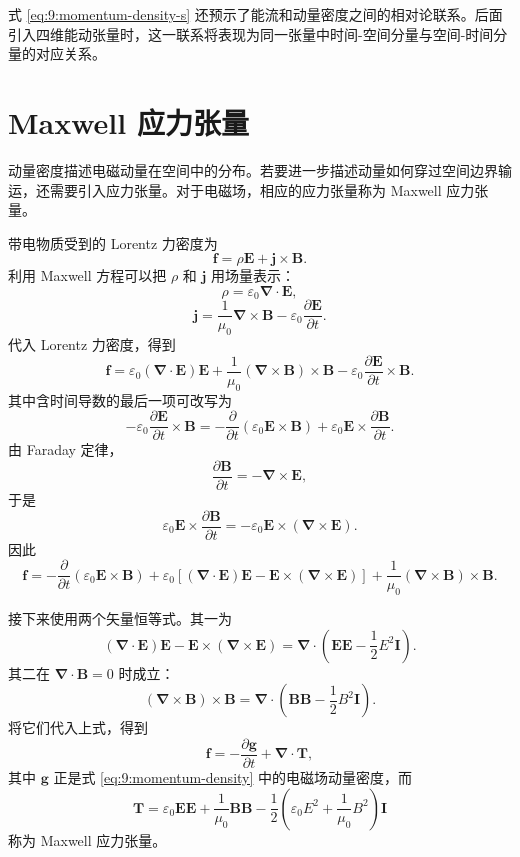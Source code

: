 式 \eqref{eq:9:momentum-density-s} 还预示了能流和动量密度之间的相对论联系。后面引入四维能动张量时，这一联系将表现为同一张量中时间-空间分量与空间-时间分量的对应关系。

\section{Maxwell 应力张量}

动量密度描述电磁动量在空间中的分布。若要进一步描述动量如何穿过空间边界输运，还需要引入应力张量。对于电磁场，相应的应力张量称为 Maxwell 应力张量。

带电物质受到的 Lorentz 力密度为
\[
\bm{f}
=
\rho\bm{E}
+
\bm{j}\times\bm{B}.
\]
利用 Maxwell 方程可以把 $\rho$ 和 $\bm{j}$ 用场量表示：
\[
\rho
=
\varepsilon_{0}\bm{\nabla}\cdot\bm{E},
\]
\[
\bm{j}
=
\frac{1}{\mu_{0}}\bm{\nabla}\times\bm{B}
-
\varepsilon_{0}
\frac{\partial\bm{E}}{\partial t}.
\]
代入 Lorentz 力密度，得到
\[
\bm{f}
=
\varepsilon_{0}
(\bm{\nabla}\cdot\bm{E})\bm{E}
+
\frac{1}{\mu_{0}}
(\bm{\nabla}\times\bm{B})\times\bm{B}
-
\varepsilon_{0}
\frac{\partial\bm{E}}{\partial t}\times\bm{B}.
\]
其中含时间导数的最后一项可改写为
\[
-\varepsilon_{0}
\frac{\partial\bm{E}}{\partial t}\times\bm{B}
=
-\frac{\partial}{\partial t}
(\varepsilon_{0}\bm{E}\times\bm{B})
+
\varepsilon_{0}
\bm{E}\times
\frac{\partial\bm{B}}{\partial t}.
\]
由 Faraday 定律，
\[
\frac{\partial\bm{B}}{\partial t}
=
-\bm{\nabla}\times\bm{E},
\]
于是
\[
\varepsilon_{0}
\bm{E}\times
\frac{\partial\bm{B}}{\partial t}
=
-\varepsilon_{0}
\bm{E}\times(\bm{\nabla}\times\bm{E}).
\]
因此
\[
\bm{f}
=
-\frac{\partial}{\partial t}
(\varepsilon_{0}\bm{E}\times\bm{B})
+
\varepsilon_{0}
\left[
(\bm{\nabla}\cdot\bm{E})\bm{E}
-
\bm{E}\times(\bm{\nabla}\times\bm{E})
\right]
+
\frac{1}{\mu_{0}}
(\bm{\nabla}\times\bm{B})\times\bm{B}.
\]

接下来使用两个矢量恒等式。其一为
\[
(\bm{\nabla}\cdot\bm{E})\bm{E}
-
\bm{E}\times(\bm{\nabla}\times\bm{E})
=
\bm{\nabla}\cdot
\left(
\bm{E}\bm{E}
-
\frac{1}{2}E^{2}\mathbf I
\right).
\]
其二在 $\bm{\nabla}\cdot\bm{B}=0$ 时成立：
\[
(\bm{\nabla}\times\bm{B})\times\bm{B}
=
\bm{\nabla}\cdot
\left(
\bm{B}\bm{B}
-
\frac{1}{2}B^{2}\mathbf I
\right).
\]
将它们代入上式，得到
\[
\bm{f}
=
-\frac{\partial\bm{g}}{\partial t}
+
\bm{\nabla}\cdot\mathbf T,
\]
其中 $\bm{g}$ 正是式 \eqref{eq:9:momentum-density} 中的电磁场动量密度，而
\begin{equation}
	\mathbf T
	=
	\varepsilon_{0}\bm{E}\bm{E}
	+
	\frac{1}{\mu_{0}}\bm{B}\bm{B}
	-
	\frac{1}{2}
	\left(
	\varepsilon_{0}E^{2}
	+
	\frac{1}{\mu_{0}}B^{2}
	\right)\mathbf I
	\label{eq:9:maxwell-stress-dyadic}
\end{equation}
称为 Maxwell 应力张量。

